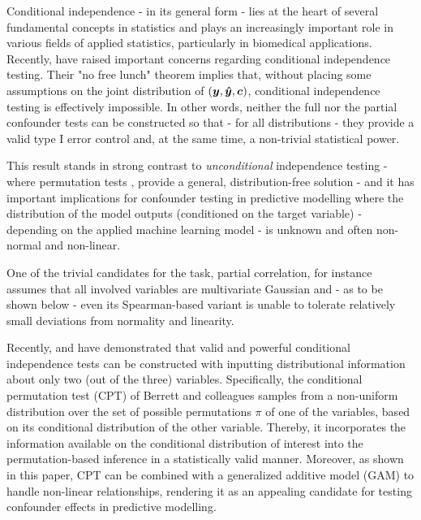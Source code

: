 \documentclass{article}
\begin{document}
 Conditional independence - in its general form - lies at the heart of several fundamental concepts in statistics and  plays an increasingly important role in various fields of applied statistics, particularly in biomedical applications\citep{spirtes2000causation, fiedler2011mediation, peters2016causal, candes2016panning}. Recently,\cite{shah2020hardness} have raised important concerns regarding conditional independence testing.
 Their "no free lunch" theorem implies that, without placing some assumptions on the joint distribution of $(\boldsymbol{y}, \boldsymbol{\hat{y}}, \boldsymbol{c})$, conditional independence testing is effectively impossible. In other words, neither the full nor the partial confounder tests can be constructed so that - for all distributions - they provide a valid type I error control and, at the same time, a non-trivial statistical power.

This result stands in strong contrast to \emph{unconditional} independence testing - where permutation tests \citep{pitman1937significance, fisher1942189}, provide a general, distribution-free solution - and it has important implications for confounder testing in predictive modelling where the distribution of the model outputs (conditioned on the target variable) - depending on the applied machine learning model - is unknown and often non-normal and non-linear.

One of the trivial candidates for the task, partial correlation, for instance assumes that all involved variables are multivariate Gaussian and - as to be shown below - even its Spearman-based variant is unable to tolerate relatively small deviations from normality and linearity.

Recently,\cite{candes2016panning} and\cite{berrett2020conditional} have demonstrated that valid and powerful conditional independence tests can be constructed with inputting distributional information about only two (out of the three) variables.
Specifically, the conditional permutation test (CPT) of Berrett and colleagues samples from a non-uniform distribution over the set of possible permutations $\pi$ of one of the variables, based on its conditional distribution of the other variable. Thereby, it incorporates the information available on the conditional distribution of interest into the permutation-based inference in a statistically valid manner. Moreover, as shown in this paper, CPT can be combined with a generalized additive model (GAM) to handle non-linear relationships, rendering it as an appealing candidate for testing confounder effects in predictive modelling.
\end{document}
